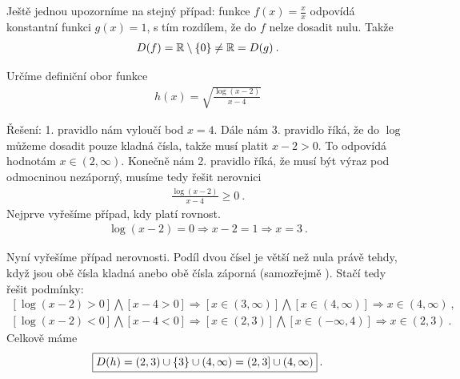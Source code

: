 \begin{example}
    Ještě jednou upozorníme na stejný případ: funkce $f(x) = \frac{x}{x}$ odpovídá konstantní funkci $g(x) = 1$, s tím rozdílem, že do $f$ nelze dosadit nulu. Takže \begin{align*}
        D(f) = \mathbb{R} \setminus \left \lbrace 0 \right \rbrace \neq \mathbb{R} = D(g) \:.
    \end{align*}
    
\end{example}

\begin{example}
    Určíme definiční obor funkce \begin{align*}
        h(x) = \sqrt{ \frac{\log (x-2)}{x-4}}
    \end{align*}

    Řešení: 1. pravidlo nám vyloučí bod $x=4$. 
    Dále nám 3. pravidlo říká, že do $\log$ můžeme dosadit pouze kladná čísla, takže musí platit $x-2>0$. To odpovídá hodnotám $x \in (2, \infty)$. 
    Konečně nám 2. pravidlo říká, že musí být výraz pod odmocninou nezáporný, musíme tedy řešit nerovnici \begin{align*}
        \frac{\log (x-2)}{x-4} \geq 0 \:.
    \end{align*}
    Nejprve vyřešíme případ, kdy platí rovnost.
    \begin{align*}
        \log (x-2) = 0 \Longrightarrow x-2 = 1 \Longrightarrow x = 3 \:.
    \end{align*}
    
    Nyní vyřešíme případ nerovnosti. Podíl dvou čísel je větší než nula právě tehdy, když jsou obě čísla kladná anebo obě čísla záporná (samozřejmě ). Stačí tedy řešit podmínky:
    \begin{align*}
        \left [\log (x-2) > 0 \right] \bigwedge \left[ x-4 > 0\right] \Longrightarrow [x \in (3,\infty)] \bigwedge [x \in (4, \infty)] \Longrightarrow x \in (4, \infty) \:, \\
        \left [\log (x-2) < 0 \right] \bigwedge \left[ x-4 < 0\right] \Longrightarrow [x \in (2,3)] \bigwedge [x \in (-\infty, 4)] \Longrightarrow x \in (2,3) \:.
    \end{align*}
    Celkově máme \begin{align*}
        \boxed{ D(h) = (2,3) \cup \left \lbrace 3 \right \rbrace \cup (4,\infty) = (2,3] \cup (4,\infty) } \:.
    \end{align*}
\end{example}


